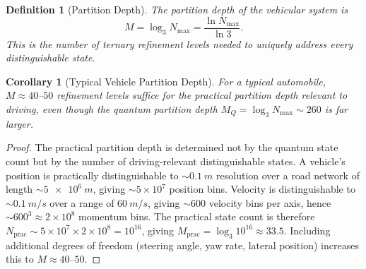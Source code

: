 \documentclass[twocolumn,10pt]{article}
\newtheorem{definition}[theorem]{Definition}
\newtheorem{corollary}[theorem]{Corollary}
\newcommand{\Nmax}{N_{\mathrm{max}}}
\begin{document}
\begin{definition}[Partition Depth]\label{def:partdepth}
The partition depth of the vehicular system is
\begin{equation}
M = \log_3 \Nmax = \frac{\ln \Nmax}{\ln 3}.
\end{equation}
This is the number of ternary refinement levels needed to uniquely address every distinguishable state.
\end{definition}

\begin{corollary}[Typical Vehicle Partition Depth]\label{cor:partdepth}
For a typical automobile, $M \approx 40$--$50$ refinement levels suffice for the \emph{practical} partition depth relevant to driving, even though the quantum partition depth $M_Q = \log_3 \Nmax \sim 260$ is far larger.
\end{corollary}

\begin{proof}
The practical partition depth is determined not by the quantum state count but by the number of driving-relevant distinguishable states. A vehicle's position is practically distinguishable to $\sim \SI{0.1}{m}$ resolution over a road network of length $\sim \SI{5e6}{m}$, giving $\sim 5 \times 10^7$ position bins. Velocity is distinguishable to $\sim \SI{0.1}{m/s}$ over a range of $\SI{60}{m/s}$, giving $\sim 600$ velocity bins per axis, hence $\sim 600^3 \approx 2 \times 10^8$ momentum bins. The practical state count is therefore $N_{\mathrm{prac}} \sim 5 \times 10^7 \times 2 \times 10^8 = 10^{16}$, giving $M_{\mathrm{prac}} = \log_3 10^{16} \approx 33.5$. Including additional degrees of freedom (steering angle, yaw rate, lateral position) increases this to $M \approx 40$--$50$.
\end{proof}
\end{document}
